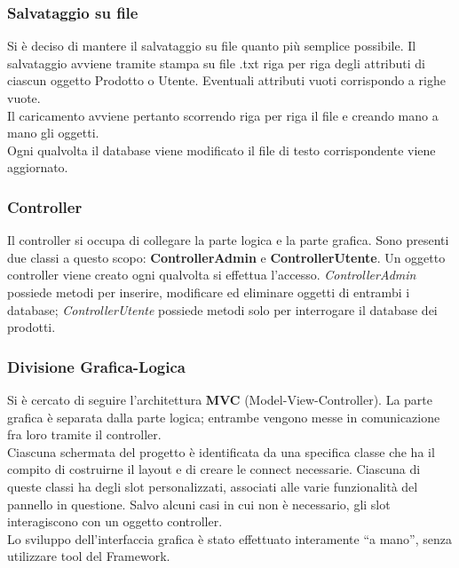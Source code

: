 \documentclass[a4paper,10pt] {article}
\begin{document}
\subsubsection{Salvataggio su file}
Si è deciso di mantere il salvataggio su file quanto più semplice possibile. Il 
salvataggio avviene tramite stampa su file .txt riga per riga degli attributi 
di 
ciascun oggetto Prodotto o Utente. Eventuali attributi vuoti corrispondo a righe 
vuote.\\
Il caricamento avviene pertanto scorrendo riga per riga il file e creando mano a 
mano gli oggetti.\\
Ogni qualvolta il database viene modificato il file di testo corrispondente 
viene aggiornato.

\subsubsection{Controller}
Il controller si occupa di collegare la parte logica e la parte grafica. Sono 
presenti due classi a questo scopo: \textbf{ControllerAdmin} e 
\textbf{ControllerUtente}.
Un oggetto controller viene creato ogni qualvolta si effettua l'accesso. 
\textsl{ControllerAdmin} possiede metodi per inserire, modificare ed eliminare 
oggetti di
entrambi i database; \textsl{ControllerUtente} possiede metodi solo per 
interrogare il database dei prodotti.

\subsubsection{Divisione Grafica-Logica}
Si è cercato di seguire l'architettura \textbf{MVC} (Model-View-Controller). La 
parte grafica è separata dalla parte logica; entrambe vengono messe in 
comunicazione
fra loro tramite il controller.\\
Ciascuna schermata del progetto è identificata da una specifica classe che ha il 
compito di costruirne il layout e di creare le connect necessarie. Ciascuna di
queste classi ha degli slot personalizzati, associati alle varie funzionalità 
del pannello in questione. Salvo alcuni casi in cui non è necessario, gli slot 
interagiscono con un oggetto controller. \\
Lo sviluppo dell'interfaccia grafica è stato effettuato interamente ``a mano'', 
senza utilizzare tool del Framework.
\end{document}
